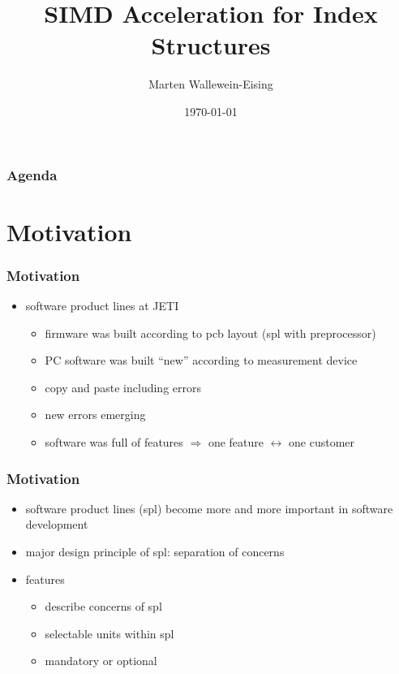 \documentclass{beamer}
\title{SIMD Acceleration for Index Structures}
\author{Marten Wallewein-Eising}
\date{\today}
\institute{Otto von Guericke Univerity Magdeburg}
\begin{document}
\begin{frame}[plain]
 \titlepage
\end{frame}



\section[Agenda]{}
\begin{frame}
\frametitle{Agenda}
\tableofcontents
\end{frame}

\section{Motivation}
\begin{frame}
\frametitle{Motivation}
\begin{itemize}
 \item software product lines at JETI
\begin{itemize}
	\item firmware was built according to pcb layout (spl with preprocessor)
	\item PC software was built ``new'' according to measurement device
	\item copy and paste including errors
	\item new errors emerging
	\item software was full of features $\Rightarrow$ one feature $\leftrightarrow$ one customer	
\end{itemize}
\end{itemize}
\end{frame}

\begin{frame}
\frametitle{Motivation}
\begin{itemize}
 \item software product lines (spl) become more and more important in software development
 \item major design principle of spl: separation of concerns 
 \item features 
	\begin{itemize}
	  \item describe concerns of spl
	  \item selectable units within spl
	  \item mandatory or optional
	\end{itemize}
 
\end{itemize}
\end{frame}
\end{document}
